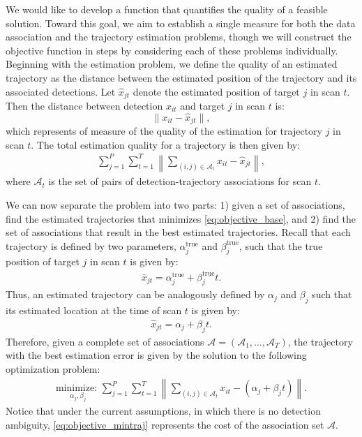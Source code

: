 We would like to develop a function that quantifies the quality of a feasible solution. Toward this goal, we aim to establish a single measure for both the data association and the trajectory estimation problems, though we will construct the objective function in steps by considering each of these problems individually. Beginning with the estimation problem, we define the quality of an estimated trajectory as the distance between the estimated position of the trajectory and its associated detections. Let $\hat{x}_{jt}$ denote the estimated position of target $j$ in scan $t$. Then the distance between detection $x_{it}$ and target $j$ in scan $t$ is:
$$\|x_{it}-\hat{x}_{jt}\|,$$
which represents of measure of the quality of the estimation for trajectory $j$ in scan $t$. The total estimation quality for a trajectory is then given by:
\begin{align}\label{eq:objective_base}
\sum_{j=1}^P\sum_{t=1}^T\left\|\sum_{(i,j)\in \mathcal{A}_{t}} x_{it} - \hat{x}_{jt}\right\|,
\end{align} 
where $\mathcal{A}_t$ is the set of pairs of detection-trajectory associations for scan $t$. 

We can now separate the problem into two parts: 1) given a set of associations, find the estimated trajectories that minimizes \eqref{eq:objective_base}, and 2) find the set of associations that result in the best estimated trajectories. Recall that each trajectory is defined by two parameters, $\alpha^{\text{true}}_{j}$ and $\beta^{\text{true}}_{j}$, such that the true position of target $j$ in scan $t$ is given by:
\begin{align}
	\bar{x}_{jt} = \alpha^{\text{true}}_{j} + \beta^{\text{true}}_{j}t.
\end{align}
Thus, an estimated trajectory can be analogously defined by $\alpha_{j}$ and $\beta_{j}$ such that its estimated location at the time of scan $t$ is given by:
\begin{align}
	\hat{x}_{jt} =  \alpha_{j} + \beta_{j}t.
\end{align}
Therefore, given a complete set of associations  $\mathcal{A}=(\mathcal{A}_1,\ldots,\mathcal{A}_T)$, the trajectory with the best estimation error is given by the solution to the following optimization problem:
\begin{align}\label{eq:objective_mintraj}
\underset{\alpha_{j}, \beta_{j}}{\text{minimize: }}\sum_{j=1}^P\sum_{t=1}^T\left\|\sum_{(i,j)\in \mathcal{A}_{t}} x_{it} - (\alpha_{j} + \beta_{j}t)\right\|.
\end{align} 
Notice that under the current assumptions, in which there is no detection ambiguity, \eqref{eq:objective_mintraj} represents the cost of the association set $\mathcal{A}$. 

